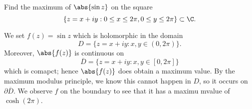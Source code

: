 \question Find the maximum of $\abs{\sin z}$ on the square
\[
    \{z = x+iy: 0 \leq x \leq 2 \pi, 0 \leq y \leq 2\pi\} \subset \C.
\]
\begin{solution}
    We set $f(z) = \sin z$ which is holomorphic in the domain
    \[
        D = \{z = x+iy: x,y \in (0,2\pi)\}.
    \]
    Moreover, $\abs{f(z)}$ is continuous on
    \[
        \overline D = \{z = x+iy: x,y \in [0,2\pi]\}
    \]
    which is comapct; hence $\abs{f(z)}$ does obtain a maximum value.
    By the maximum modulus principle, we know this cannot happen in $D$,
    so it occurs on $\partial \overline D$.
    We observe $f$ on the boundary to see that it has a maximu mvalue of $\cosh(2\pi)$.
\end{solution}
